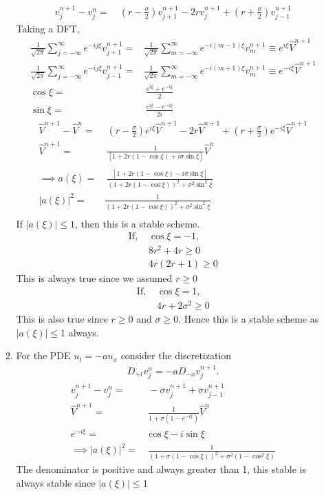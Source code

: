 \documentclass[11pt]{article}
\newcommand{\Dpt}{D_{+t}}
\newcommand{\Dmx}{D_{-x}}
\newcommand{\vnj}{v^{n}_j}
\newcommand{\vnpj}{v^{n+1}_j}
\newcommand{\vnpjp}{v^{n+1}_{j+1}}
\newcommand{\vnpjm}{v^{n+1}_{j-1}}
\newcommand{\modu}[1]{\left | {#1} \right |}
\newcommand{\hVnp}{\hat{V}^{n+1}}
\newcommand{\hVn}{\hat{V}^n}
\begin{document}
\begin{enumerate}
\begin{enumerate}
  \begin{align*}
  \vnpj - \vnj = & \ \left(r - \frac{\sigma}{2}\right)\vnpjp - 2r\vnpj + \left(r+\frac{\sigma}{2}\right)\vnpjm
  \end{align*}
  Taking a DFT,
  \begin{align*}
  \frac{1}{\sqrt{2\pi}}\sum_{j=-\infty}^{\infty}e^{-ij\xi}\vnpjp =& \frac{1}{\sqrt{2\pi}}\sum_{m=-\infty}^{\infty}e^{-i(m-1)\xi}v^{n+1}_m \equiv e^{i\xi}\hat{V}^{n+1}\\
  \frac{1}{\sqrt{2\pi}}\sum_{j=-\infty}^{\infty}e^{-ij\xi}\vnpjm =& \frac{1}{\sqrt{2\pi}}\sum_{m=-\infty}^{\infty}e^{-i(m+1)\xi}v^{n+1}_m \equiv e^{-i\xi}\hat{V}^{n+1} \\
  \cos\xi = & \ \frac{e^{i\xi} + e^{-i\xi}}{2} \\
  \sin\xi = & \ \frac{e^{i\xi}-e^{-i\xi}}{2i}
  \end{align*}
  \begin{align*}
  \hVnp - \hVn = & \ \left(r-\frac{\sigma}{2}\right)e^{i\xi}\hVnp - 2r\hVnp + \left(r+ \frac{\sigma}{2}\right)e^{-i\xi}\hVnp \\
  \hVnp  = & \ \frac{1}{\left[1+2r(1-\cos\xi) + i\sigma\sin\xi\right]}\hVn \\ \\
  \implies a(\xi) = & \ \frac{\left[1+2r(1-\cos\xi) - i\sigma\sin\xi\right]}{(1+2r(1-\cos\xi))^2 + \sigma^2\sin^2\xi} \\ 
  \modu{a(\xi)}^2 = & \frac{1}{(1+2r(1-\cos\xi))^2 + \sigma^2\sin^2\xi} \\
  \end{align*}
  If $\modu{a(\xi)} \leq 1$, then this is a stable scheme.
  \begin{align*}
  \text{If, } & \cos\xi = -1, \\
  & 8r^2 + 4r \geq 0 \\
  & 4r(2r+1) \geq 0
  \end{align*}
  This is always true since we assumed $r\geq 0$
  \begin{align*}
  \text{If, } & \cos\xi = 1, \\
  & 4r + 2\sigma^2 \geq 0 
  \end{align*}
  This is also true since $r\geq 0$ and $\sigma \geq 0$.  Hence this is a stable scheme as $\modu{a(\xi)}\leq 1$ always.
  \item{ \color{blue}For the PDE }$u_t= -au_x${ \color{blue}consider the discretization}
        \begin{align*}
          \Dpt v_j^n = -a\Dmx v_j^{n+1}.
        \end{align*}
  \begin{align*}
  \vnpj - \vnj = & \ -\sigma \vnpj + \sigma \vnpjm \\
  \hVnp = & \ \frac{1}{1+\sigma\left(1-e^{-i\xi}\right)} \hVn \\
  e^{-i\xi} = & \cos\xi - i\sin\xi \\
  \implies \modu{a(\xi)}^2 = & \  \frac{1}{(1+\sigma(1-\cos\xi))^2+\sigma^2(1-\cos^2\xi)}
  \end{align*}
  The denominator is positive and always greater than 1, this stable is always stable since $\modu{a(\xi)}\leq 1$
  \end{enumerate}
  
\end{enumerate}
\end{document}
